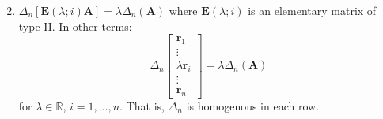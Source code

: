 \documentclass{article}
\newcommand{\bff}[1]{\mathbf{#1}}
\begin{document}
    \begin{minipage}[t]{0.45\linewidth}
        \begin{enumerate}[label=D\Roman*]
            \setcounter{enumi}{1}
            \item $\Delta_n[\bff{E}(\lambda;i)\bff{A}] = \lambda \Delta_n(\bff{A})$ where $\bff{E}(\lambda;i)$ is an elementary matrix of type II. In other terms:
            \begin{equation*}
                \Delta_n\begin{bmatrix}
                    \bff{r}_1 \\ \vdots \\ \lambda \bff{r}_i \\ \vdots \\ \bff{r}_n
                \end{bmatrix} = \lambda \Delta_n(\bff{A})
            \end{equation*}
            for $\lambda \in \mathbb{R}$, $i=1,\dots, n$. That is, $\Delta_n$ is homogenous in each row.
        \end{enumerate}
        \vspace{2mm}


\end{minipage}
\end{document}
